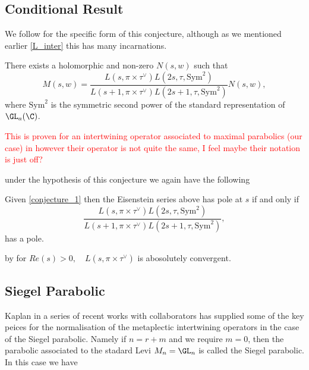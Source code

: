     \subsection{Conditional Result}
     We follow \cite[Assumption 6.1]{wuThetaCorrespondenceSimple2024wuThetaCorrespondenceSimple2024} for the specific form of this conjecture, although as we mentioned earlier \ref{L_inter} this has many incarnations. 
     \begin{Conj}\label{conjecture_1}
        There exists a holomorphic and non-zero \(N(s,w)\) such that 
     \[M(s, w) = \frac{L(s, \pi\times \tau^{\vee}) L(2s, \tau, \mathrm{Sym}^2)}{L(s+1, \pi\times \tau^\vee)L(2s+1, \tau, \mathrm{Sym}^2)}N(s,w),\]
     where \(\mathrm{Sym}^2\) is the symmetric second power of the standard representation of \(\GL_a(\C)\).
     \end{Conj}
     \textcolor{red}{This is proven for an intertwining operator associated to maximal parabolics (our case) in \cite[Thm. 7.10]{gaoLanglandsShahidiFunctionsBrylinskiDeligne2018} however their operator is not quite the same, I feel maybe their notation is just off?}

     under the hypothesis of this conjecture we again have the following
     \begin{Lemma}
        Given \ref{conjecture_1} then the Eisenstein series above has pole at \(s\) if and only if 
        \[\frac{L(s, \pi\times \tau^{\vee}) L(2s, \tau, \mathrm{Sym}^2)}{L(s+1, \pi\times \tau^\vee)L(2s+1, \tau, \mathrm{Sym}^2)},\]
        has a pole.
     \end{Lemma}
     by \cite[Thm. 35]{kaplanDoublingConstructionsComplete2021a} for \(Re(s)>0, \quad L(s, \pi\times \tau^{\vee})\) is abosolutely convergent. 


    \subsection{Siegel Parabolic}


    Kaplan in a series of recent works with collaborators \cite{kaplanDoublingConstructionsComplete2021a}\cite{kaplanDoublingConstructionsTensor2020}\cite{caiDoublingConstructionsGlobal2024} has supplied some of the key peices for the normalisation of the metaplectic intertwining operators in the case of the Siegel parabolic. Namely if \(n = r+ m\) and we require \(m=0\), then the parabolic associated to the stadard Levi \(M_n = \GL_n\) is called the Siegel parabolic. In this case we have

